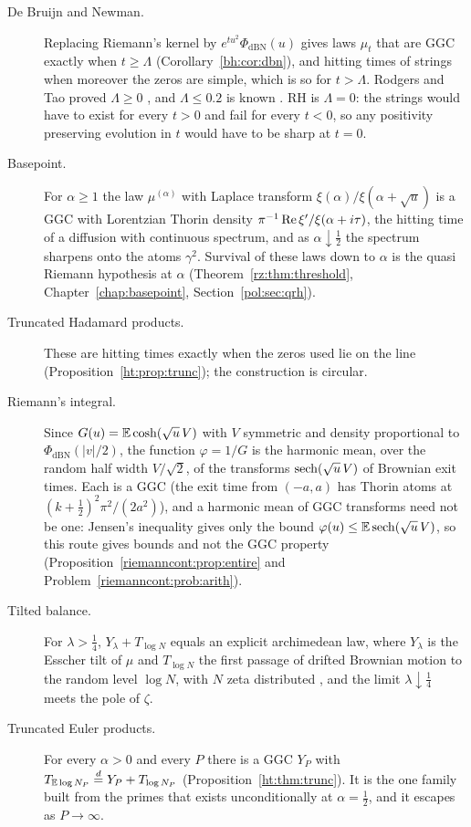 \begin{description}
\item[De Bruijn and Newman.] Replacing Riemann's kernel by $e^{tu^2}\Phi_{\mathrm{dBN}}(u)$ gives laws $\mu_t$ that are GGC exactly when $t\ge\Lambda$ (Corollary~\ref{bh:cor:dbn}), and hitting times of strings when moreover the zeros are simple, which is so for $t>\Lambda$. Rodgers and Tao proved $\Lambda\ge0$ \cite{RodgersTao}, and $\Lambda\le0.2$ is known \cite{PT21}. RH is $\Lambda=0$: the strings would have to exist for every $t>0$ and fail for every $t<0$, so any positivity preserving evolution in $t$ would have to be sharp at $t=0$. %
\item[Basepoint.] For $\alpha\ge1$ the law $\mu^{(\alpha)}$ with Laplace transform $\xi(\alpha)/\xi(\alpha+\sqrt u)$ is a GGC with Lorentzian Thorin density $\pi^{-1}\operatorname{Re}\xi'/\xi(\alpha+i\tau)$, the hitting time of a diffusion with continuous spectrum, and as $\alpha\downarrow\frac12$ the spectrum sharpens onto the atoms $\gamma^2$. Survival of these laws down to $\alpha$ is the quasi Riemann hypothesis at $\alpha$ (Theorem~\ref{rz:thm:threshold}, Chapter~\ref{chap:basepoint}, Section~\ref{pol:sec:qrh}).
\item[Truncated Hadamard products.] These are hitting times exactly when the zeros used lie on the line (Proposition~\ref{ht:prop:trunc}); the construction is circular.
\item[Riemann's integral.] Since $G(u)=\mathbb{E}\cosh(\sqrt u\,V)$ with $V$ symmetric and density proportional to $\Phi_{\mathrm{dBN}}(|v|/2)$, the function $\varphi=1/G$ is the harmonic mean, over the random half width $V/\sqrt2$, of the transforms $\operatorname{sech}(\sqrt u\,V)$ of Brownian exit times. Each is a GGC (the exit time from $(-a,a)$ has Thorin atoms at $(k+\frac12)^2\pi^2/(2a^2)$), and a harmonic mean of GGC transforms need not be one: Jensen's inequality gives only the bound $\varphi(u)\le\mathbb{E}\operatorname{sech}(\sqrt u\,V)$, so this route gives bounds and not the GGC property (Proposition~\ref{riemanncont:prop:entire} and Problem~\ref{riemanncont:prob:arith}).
\item[Tilted balance.] For $\lambda>\frac14$, $Y_\lambda+T_{\log N}$ equals an explicit archimedean law, where $Y_\lambda$ is the Esscher tilt of $\mu$ and $T_{\log N}$ the first passage of drifted Brownian motion to the random level $\log N$, with $N$ zeta distributed \cite{P17}, and the limit $\lambda\downarrow\frac14$ meets the pole of $\zeta$. %
\item[Truncated Euler products.] For every $\alpha>0$ and every $P$ there is a GGC $Y_P$ with $T_{\mathbb{E}\log N_P}\overset d=Y_P+T_{\log N_P}$ (Proposition~\ref{ht:thm:trunc}). It is the one family built from the primes that exists unconditionally at $\alpha=\frac12$, and it escapes as $P\to\infty$.
\end{description}

